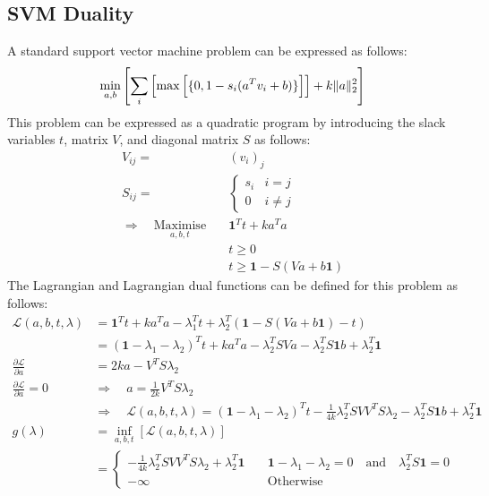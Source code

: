 \subsection{SVM Duality}
A standard support vector machine problem can be expressed as follows:
\begin{equation*}
    \min_{a, b}{\left[ \sum_i{\Bigl[ \max{ \Bigl[ \{ 0, 1-s_i(a^Tv_i + b) \} \Bigl] } \Bigl]} + k\Vert a \Vert_2^2 \right]}
\end{equation*}
This problem can be expressed as a quadratic program by introducing the slack variables $t$, matrix $V$, and diagonal matrix $S$ as follows:
\begin{align*}
    V_{ij} = &(v_i)_j \\
    S_{ij} = &\begin{cases}
        s_i & i = j \\
        0 & i \ne j
    \end{cases} \\
    \Rightarrow \quad \underset{a, b, t}{\text{Maximise}} \quad & \mathbf{1}^T t + k a^T a \\
    & t \ge 0 \\
    & t \ge \mathbf{1} - S(Va + b\mathbf{1})
\end{align*}
The Lagrangian and Lagrangian dual functions can be defined for this problem as follows:
\begin{align*}
    \mathcal{L}(a, b, t, \lambda) &= \mathbf{1}^T t + k a^T a - \lambda_1^Tt + \lambda_2^T(\mathbf{1} - S(Va + b\mathbf{1}) - t) \\
    &= (\mathbf{1} - \lambda_1 - \lambda_2)^T t + ka^T a - \lambda_2^TSVa - \lambda_2^TS\mathbf{1}b + \lambda_2^T\mathbf{1} \\
    \frac{\partial\mathcal{L}}{\partial a} &= 2ka - V^TS\lambda_2 \\
    \frac{\partial\mathcal{L}}{\partial a} = 0 \quad &\Rightarrow \quad a = \frac{1}{2k}V^TS\lambda_2 \\
    &\Rightarrow \quad \mathcal{L}(a, b, t, \lambda) = (\mathbf{1} - \lambda_1 - \lambda_2)^T t -\frac{1}{4k}\lambda_2^TSVV^TS\lambda_2 - \lambda_2^TS\mathbf{1}b + \lambda_2^T\mathbf{1} \\
    g(\lambda) &= \underset{a, b, t}{\inf}\left[\mathcal{L}(a, b, t, \lambda)\right] \\
    &= \begin{cases}
        -\frac{1}{4k}\lambda_2^TSVV^TS\lambda_2 + \lambda_2^T\mathbf{1} \quad & \mathbf{1} - \lambda_1 - \lambda_2 = 0 \quad \text{and} \quad \lambda_2^TS\mathbf{1} = 0 \\
        -\infty & \text{Otherwise}
    \end{cases}
\end{align*}

